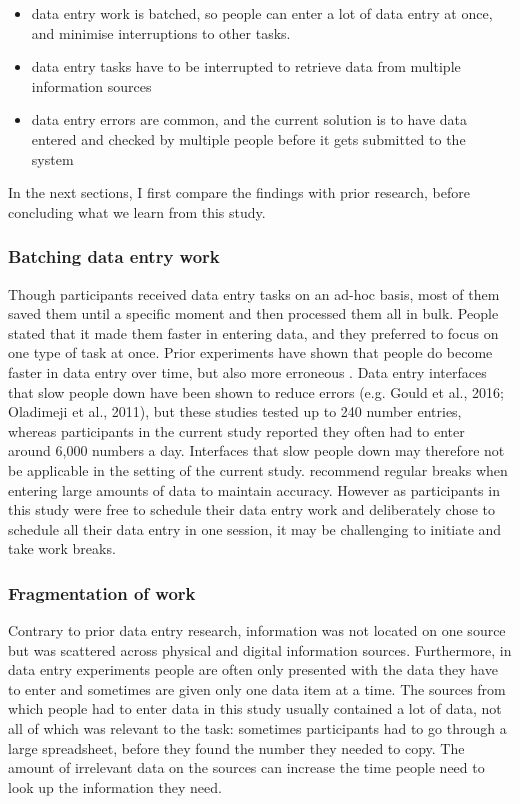 \begin{itemize}

\item 
data entry work is batched, so people can enter a lot of data entry at once, and minimise interruptions to other tasks. 
\item 
data entry tasks have to be interrupted to retrieve data from multiple information sources
\item 
data entry errors are common, and the current solution is to have data entered and checked by multiple people before it gets submitted to the system
\end{itemize}

In the next sections, I first compare the findings with prior research, before concluding what we learn from this study. 

\subsubsection{Batching data entry work}
Though participants received data entry tasks on an ad-hoc basis, most of them saved them until a specific moment and then processed them all in bulk. People stated that it made them faster in entering data, and they preferred to focus on one type of task at once. Prior experiments have shown that people do become faster in data entry over time, but also more erroneous \citep{Healy2004}. Data entry interfaces that slow people down have been shown to reduce errors (e.g. Gould et al., 2016; Oladimeji et al., 2011), but these studies tested up to 240 number entries, whereas participants in the current study reported they often had to enter around 6,000 numbers a day. Interfaces that slow people down may therefore not be applicable in the setting of the current study. \citet{Healy2004} recommend regular breaks when entering large amounts of data to maintain accuracy. However as participants in this study were free to schedule their data entry work and deliberately chose to schedule all their data entry in one session, it may be challenging to initiate and take work breaks. 

\subsubsection{Fragmentation of work}
Contrary to prior data entry research, information was not located on one source but was scattered across physical and digital information sources. Furthermore, in data entry experiments people are often only presented with the data they have to enter and sometimes are given only one data item at a time. The sources from which people had to enter data in this study usually contained a lot of data, not all of which was relevant to the task: sometimes participants had to go through a large spreadsheet, before they found the number they needed to copy. The amount of irrelevant data on the sources can increase the time people need to look up the information they need. 

